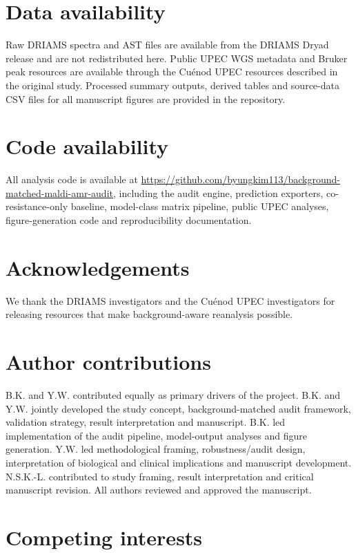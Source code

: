 \documentclass[11pt]{article}
\begin{document}
\section*{Data availability}

Raw DRIAMS spectra and AST files are available from the DRIAMS Dryad release\cite{driamsdryad} and are not redistributed here. Public UPEC WGS metadata and Bruker peak resources are available through the Cu\'{e}nod UPEC resources described in the original study\cite{cuenod2023papgii}. Processed summary outputs, derived tables and source-data CSV files for all manuscript figures are provided in the repository.

\section*{Code availability}

All analysis code is available at \url{https://github.com/byungkim113/background-matched-maldi-amr-audit}, including the audit engine, prediction exporters, co-resistance-only baseline, model-class matrix pipeline, public UPEC analyses, figure-generation code and reproducibility documentation.

\section*{Acknowledgements}

We thank the DRIAMS investigators and the Cu\'{e}nod UPEC investigators for releasing resources that make background-aware reanalysis possible.

\section*{Author contributions}

B.K. and Y.W. contributed equally as primary drivers of the project. B.K. and Y.W. jointly developed the study concept, background-matched audit framework, validation strategy, result interpretation and manuscript. B.K. led implementation of the audit pipeline, model-output analyses and figure generation. Y.W. led methodological framing, robustness/audit design, interpretation of biological and clinical implications and manuscript development. N.S.K.-L. contributed to study framing, result interpretation and critical manuscript revision. All authors reviewed and approved the manuscript.

\section*{Competing interests}
\end{document}
